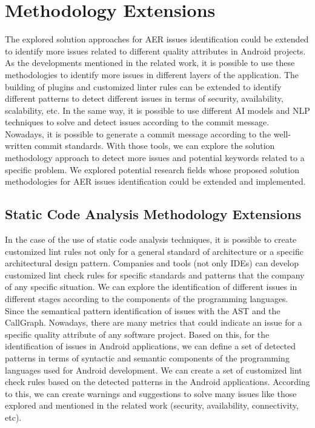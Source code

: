 \chapter{Methodology Extensions}
\label{cha:extensions}

The explored solution approaches for AER issues identification could be extended to identify more issues related to different quality attributes in Android projects. As the developments mentioned in the related work, it is possible to use these methodologies to identify more issues in different layers of the application. The building of plugins and customized linter rules can be extended to identify different patterns to detect different issues in terms of security, availability, scalability, etc. In the same way, it is possible to use different AI models and NLP techniques to solve and detect issues according to the commit message. Nowadays, it is possible to generate a commit message according to the well-written commit standards. With those tools, we can explore the solution methodology approach to detect more issues and potential keywords related to a specific problem. We explored potential research fields whose proposed solution methodologies for AER issues identification could be extended and implemented.


\section{Static Code Analysis Methodology Extensions}
In the case of the use of static code analysis techniques, it is possible to create customized lint rules not only for a general standard of architecture or a specific architectural design pattern. Companies and tools (not only IDEs) can develop customized lint check rules for specific standards and patterns that the company of any specific situation.
We can explore the identification of different issues in different stages according to the components of the programming languages. Since the semantical pattern identification of issues with the AST and the CallGraph. Nowadays, there are many metrics that could indicate an issue for a specific quality attribute of any software project. Based on this, for the identification of issues in Android applications, we can define a set of detected patterns in terms of syntactic and semantic components of the programming languages used for Android development. We can create a set of customized lint check rules based on the detected patterns in the Android applications. According to this, we can create warnings and suggestions to solve many issues like those explored and mentioned in the related work (security, availability, connectivity, etc).

